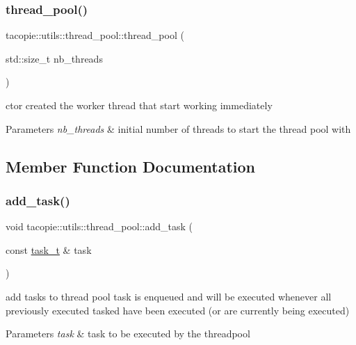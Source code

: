 \subsubsection{\texorpdfstring{thread\+\_\+pool()}{thread\_pool()}}
{\footnotesize\ttfamily tacopie\+::utils\+::thread\+\_\+pool\+::thread\+\_\+pool (\begin{DoxyParamCaption}\item[{std\+::size\+\_\+t}]{nb\+\_\+threads }\end{DoxyParamCaption})\hspace{0.3cm}{\ttfamily [explicit]}}

ctor created the worker thread that start working immediately


\begin{DoxyParams}{Parameters}
{\em nb\+\_\+threads} & initial number of threads to start the thread pool with \\
\hline
\end{DoxyParams}


\subsection{Member Function Documentation}
\mbox{\label{classtacopie_1_1utils_1_1thread__pool_a450bee2b7b2cd0aa0bc3935c8adc9ace}} 
\subsubsection{\texorpdfstring{add\+\_\+task()}{add\_task()}}
{\footnotesize\ttfamily void tacopie\+::utils\+::thread\+\_\+pool\+::add\+\_\+task (\begin{DoxyParamCaption}\item[{const \hyperlink{classtacopie_1_1utils_1_1thread__pool_a8ae8886fdeaa8e5c0abad12626a47296}{task\+\_\+t} \&}]{task }\end{DoxyParamCaption})}

add tasks to thread pool task is enqueued and will be executed whenever all previously executed tasked have been executed (or are currently being executed)


\begin{DoxyParams}{Parameters}
{\em task} & task to be executed by the threadpool \\
\hline
\end{DoxyParams}
\mbox{\label{classtacopie_1_1utils_1_1thread__pool_a77a647a75be188a5c5f83b922c061107}} 

